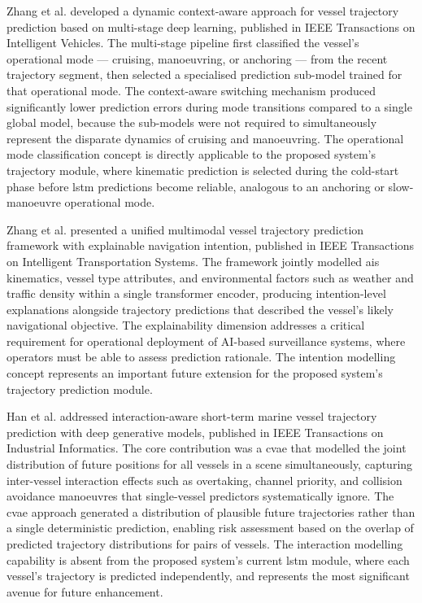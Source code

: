 Zhang et al. \cite{Zhang2024} developed a dynamic context-aware approach for
vessel trajectory prediction based on multi-stage deep learning, published in
IEEE Transactions on Intelligent Vehicles. The multi-stage pipeline first classified
the vessel's operational mode --- cruising, manoeuvring, or anchoring --- from the
recent trajectory segment, then selected a specialised prediction sub-model trained
for that operational mode. The context-aware switching mechanism produced significantly lower prediction errors during mode transitions compared to a single global model, because the sub-models were not required to simultaneously represent the disparate dynamics of cruising and manoeuvring. The operational mode classification concept is directly applicable to the proposed system's trajectory module, where kinematic prediction is selected during the cold-start phase before \gls{lstm} predictions become reliable, analogous to an anchoring or slow-manoeuvre operational mode.
 
Zhang et al. \cite{Zhang2026a} presented a unified multimodal vessel trajectory
prediction framework with explainable navigation intention, published in IEEE
Transactions on Intelligent Transportation Systems. The framework jointly modelled
\gls{ais} kinematics, vessel type attributes, and environmental factors such as weather
and traffic density within a single transformer encoder, producing intention-level
explanations alongside trajectory predictions that described the vessel's likely
navigational objective. The explainability dimension addresses a critical requirement
for operational deployment of AI-based surveillance systems, where operators must
be able to assess prediction rationale. The intention modelling concept represents
an important future extension for the proposed system's trajectory prediction module.
 
Han et al. \cite{Han2024} addressed interaction-aware short-term marine vessel
trajectory prediction with deep generative models, published in IEEE Transactions
on Industrial Informatics. The core contribution was a \gls{cvae} that modelled the joint distribution of future positions for
all vessels in a scene simultaneously, capturing inter-vessel interaction effects
such as overtaking, channel priority, and collision avoidance manoeuvres that
single-vessel predictors systematically ignore. The \gls{cvae} approach generated a
distribution of plausible future trajectories rather than a single deterministic
prediction, enabling risk assessment based on the overlap of predicted trajectory
distributions for pairs of vessels. The interaction modelling capability is absent
from the proposed system's current \gls{lstm} module, where each vessel's trajectory is
predicted independently, and represents the most significant avenue for future
enhancement.
 
